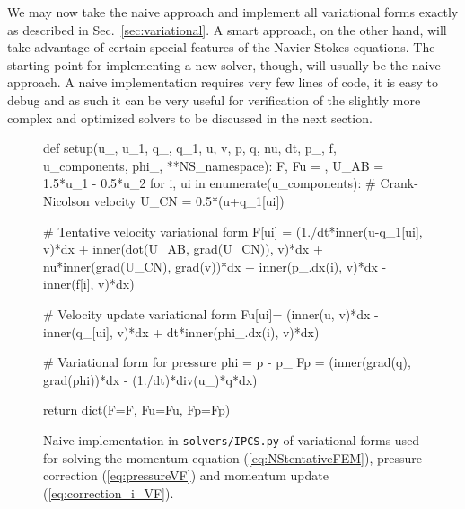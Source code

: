 \documentclass[final,3p,times,twocolumn]{elsarticle}
\newcommand{\inpyth}{\lstinline[style=inlinestyle]} %[]%
\begin{document}
We may now take the naive approach and implement all variational forms exactly as described in Sec.~\ref{sec:variational}. A smart approach, on the other hand, will take advantage of certain special features of the Navier-Stokes equations. The starting point for implementing a new solver, though, will usually be the naive approach. A naive implementation requires very few lines of code, it is easy to debug and as such it can be very useful for verification of the slightly more complex and optimized solvers to be discussed in the next section.
\begin{figure}[ht!]
\begin{python}
def setup(u_, u_1, q_, q_1, u, v, p, q,
          nu, dt, p_, f, u_components,
          phi_, **NS_namespace):
  F, Fu = {}, {}
  U_AB = 1.5*u_1 - 0.5*u_2
  for i, ui in enumerate(u_components):
    # Crank-Nicolson velocity
    U_CN = 0.5*(u+q_1[ui])

    # Tentative velocity variational form
    F[ui] = (1./dt*inner(u-q_1[ui], v)*dx
      + inner(dot(U_AB, grad(U_CN)), v)*dx
      + nu*inner(grad(U_CN), grad(v))*dx
      + inner(p_.dx(i), v)*dx
      - inner(f[i], v)*dx)

    # Velocity update variational form
    Fu[ui]= (inner(u, v)*dx
            - inner(q_[ui], v)*dx
            + dt*inner(phi_.dx(i), v)*dx)

  # Variational form for pressure
  phi = p - p_
  Fp = (inner(grad(q), grad(phi))*dx
     - (1./dt)*div(u_)*q*dx)

  return dict(F=F, Fu=Fu, Fp=Fp)
\end{python}
\caption{Naive implementation in \inpyth{solvers/IPCS.py} of variational forms used for solving the momentum equation (\ref{eq:NStentativeFEM}), pressure correction (\ref{eq:pressureVF}) and momentum update (\ref{eq:correction_i_VF}).}
\label{lst:momentumNaive}
\end{figure}
\end{document}
